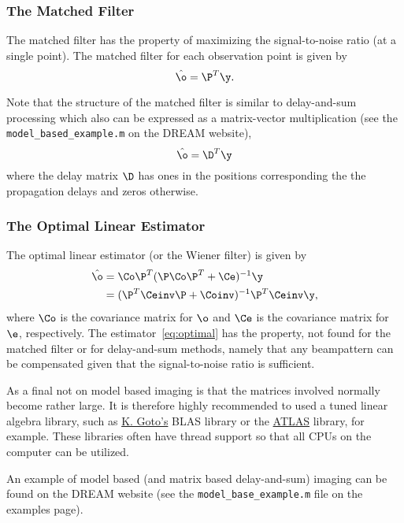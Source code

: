 \subsubsection{The Matched Filter}

The matched filter has the property of maximizing the signal-to-noise ratio (at a single point). The matched filter
for each observation point is given by~\cite{Lingvall2003}
%
\begin{equation}
  \hat{\o}= \P^T\y.
  \label{eq:matched-filter}
\end{equation}

Note that the structure of the matched filter is similar to delay-and-sum processing which  also can be expressed
as a matrix-vector multiplication (see the \texttt{model\_based\_example.m} on the DREAM website),
\begin{equation}
  \hat{\o}= \D^T\y
  \label{eq:das}
\end{equation}
%
where the delay matrix $\D$ has ones in the positions corresponding the the propagation delays and zeros otherwise.

\subsubsection{The Optimal Linear  Estimator}

The optimal linear estimator (or the Wiener filter) is given by~\cite{Stoughton1993,Lingvall2007}
%
\begin{equation}
  \begin{split}
    \hat{\o} & = \Co\P^T(\P\Co\P^T+\Ce)^{-1}\y\\
    & = (\P^T\Ceinv\P+\Coinv)^{-1}\P^T\Ceinv\y,
  \end{split}
\label{eq:optimal}
\end{equation}
%
where $\Co$ is the covariance matrix for $\o$ and $\Ce$ is the covariance matrix for $\e$, respectively.
The estimator~\eqref{eq:optimal} has the property, not found for the matched filter or for delay-and-sum
methods, namely that any beampattern can be compensated given that the signal-to-noise ratio is sufficient.

As a final not on model based imaging is that the matrices involved normally become rather large. It is
therefore highly recommended to used a tuned linear algebra library, such as
\href{http://www.tacc.utexas.edu/resources/software/}{K. Goto's} BLAS library or
the \href{http://math-atlas.sourceforge.net/}{ATLAS} library, for example. These libraries often have thread
support so that all CPUs on the computer can be utilized.

An example of model based (and matrix based delay-and-sum) imaging can be found on the DREAM website (see the
\texttt{model\_base\_example.m} file on the examples page).
